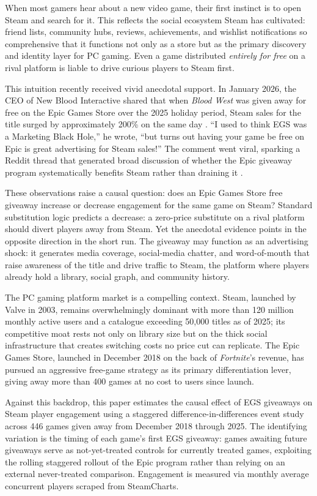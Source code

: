 \documentclass[11pt]{article}
\begin{document}
When most gamers hear about a new video game, their first instinct is to open Steam
and search for it. This reflects the social ecosystem Steam has cultivated: friend
lists, community hubs, reviews, achievements, and wishlist notifications so
comprehensive that it functions not only as a store but as the primary discovery and
identity layer for PC gaming. Even a game distributed \textit{entirely for free} on a
rival platform is liable to drive curious players to Steam first.

This intuition recently received vivid anecdotal support. In January 2026, the CEO of
New Blood Interactive shared that when \textit{Blood West} was given away for free on
the Epic Games Store over the 2025 holiday period, Steam sales for the title surged
by approximately 200\% on the same day \citep{frvr2026}. ``I used to think EGS was a
Marketing Black Hole,'' he wrote, ``but turns out having your game be free on Epic is
great advertising for Steam sales!'' The comment went viral, sparking a Reddit thread
that generated broad discussion of whether the Epic giveaway program systematically
benefits Steam rather than draining it \citep{reddit2026}.

These observations raise a causal question: does an Epic Games Store free giveaway
increase or decrease engagement for the same game on Steam? Standard substitution
logic predicts a decrease: a zero-price substitute on a rival platform should divert
players away from Steam. Yet the anecdotal evidence points in the opposite direction
in the short run. The giveaway may function as an advertising shock: it generates
media coverage, social-media chatter, and word-of-mouth that raise awareness of the
title and drive traffic to Steam, the platform where players already hold a
library, social graph, and community history.

The PC gaming platform market is a compelling context. Steam, launched by Valve in
2003, remains overwhelmingly dominant with more than 120 million monthly active users
and a catalogue exceeding 50{,}000 titles as of 2025; its competitive moat rests not
only on library size but on the thick social infrastructure that creates switching
costs no price cut can replicate. The Epic Games Store, launched in December 2018 on
the back of \textit{Fortnite}'s revenue, has pursued an aggressive free-game strategy
as its primary differentiation lever, giving away more than 400 games at no cost to
users since launch.

Against this backdrop, this paper estimates the causal effect of EGS giveaways on
Steam player engagement using a staggered difference-in-differences event study
across 446 games given away from December 2018 through 2025. The identifying variation
is the timing of each game's first EGS giveaway: games awaiting future giveaways
serve as not-yet-treated controls for currently treated games, exploiting the rolling
staggered rollout of the Epic program rather than relying on an external never-treated
comparison. Engagement is measured via monthly average concurrent players scraped from
SteamCharts.
\end{document}
